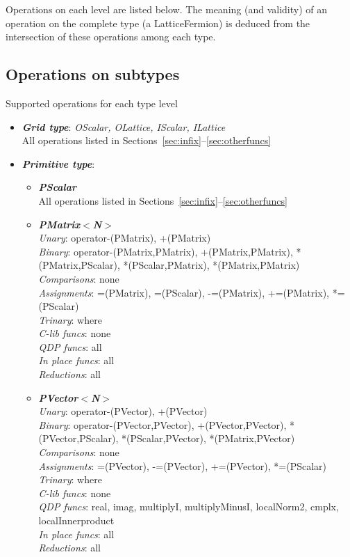 \documentclass[12pt,letterpaper]{article}
\begin{document}
Operations on each level are listed below. The meaning (and validity)
of an operation on the complete type (a LatticeFermion) is deduced
from the intersection of these operations among each type.

\subsection{Operations on subtypes}

Supported operations for each type level
\begin{itemize}
\item
{\bf\em Grid type}: {\em OScalar, OLattice, IScalar, ILattice}\\
All operations listed in Sections~\ref{sec:infix}--\ref{sec:otherfuncs}

\item
{\bf\em Primitive type}:
\begin{itemize}
\item
{\bf\em PScalar}\\
All operations listed in Sections~\ref{sec:infix}--\ref{sec:otherfuncs}

\item
{\bf\em PMatrix$<$N$>$}\\
  {\em Unary}: operator-(PMatrix), +(PMatrix)\\
  {\em Binary}: operator-(PMatrix,PMatrix), +(PMatrix,PMatrix), *(PMatrix,PScalar), 
       *(PScalar,PMatrix), *(PMatrix,PMatrix)\\
  {\em Comparisons}: none\\
  {\em Assignments}: =(PMatrix), =(PScalar), -=(PMatrix), +=(PMatrix), *=(PScalar)\\
  {\em Trinary}: where\\
  {\em C-lib funcs}: none\\
  {\em QDP funcs}: all\\
  {\em In place funcs}: all\\
  {\em Reductions}: all\\

\item
{\bf\em PVector$<$N$>$}\\
  {\em Unary}: operator-(PVector), +(PVector)\\
  {\em Binary}: operator-(PVector,PVector), +(PVector,PVector), *(PVector,PScalar), 
       *(PScalar,PVector), *(PMatrix,PVector)\\
  {\em Comparisons}: none\\
  {\em Assignments}: =(PVector), -=(PVector), +=(PVector), *=(PScalar)\\
  {\em Trinary}: where\\
  {\em C-lib funcs}: none\\
  {\em QDP funcs}: real, imag, multiplyI, multiplyMinusI, localNorm2, cmplx, 
	localInnerproduct\\
  {\em In place funcs}: all\\
  {\em Reductions}: all\\


\end{itemize}
\end{itemize}
\end{document}
